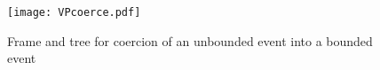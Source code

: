 \begin{figure}[H]
\hfill{}\hfill%
 \texttt{[image: VPcoerce.pdf]}\hfill
\caption{Frame and tree for coercion of an unbounded event into a bounded event \label{app:coerce}}
\end{figure}
